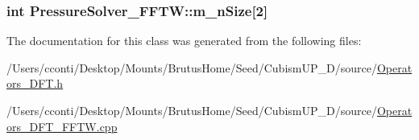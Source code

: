 \subsubsection[{m\+\_\+n\+Size}]{\setlength{\rightskip}{0pt plus 5cm}int Pressure\+Solver\+\_\+\+F\+F\+T\+W\+::m\+\_\+n\+Size\mbox{[}2\mbox{]}\hspace{0.3cm}{\ttfamily [protected]}}\label{class_pressure_solver___f_f_t_w_ab8e6476a6cfeff321785f4cb0220aa08}


The documentation for this class was generated from the following files\+:\begin{DoxyCompactItemize}
\item 
/\+Users/cconti/\+Desktop/\+Mounts/\+Brutus\+Home/\+Seed/\+Cubism\+U\+P\+\_\+D/source/\hyperlink{_operators___d_f_t_8h}{Operators\+\_\+\+D\+F\+T.\+h}\item 
/\+Users/cconti/\+Desktop/\+Mounts/\+Brutus\+Home/\+Seed/\+Cubism\+U\+P\+\_\+D/source/\hyperlink{_operators___d_f_t___f_f_t_w_8cpp}{Operators\+\_\+\+D\+F\+T\+\_\+\+F\+F\+T\+W.\+cpp}\end{DoxyCompactItemize}

